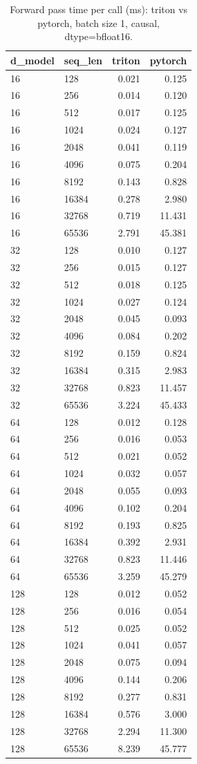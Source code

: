 \begin{table}
\centering
\begin{tabular}{llrr}
\toprule
d\_model & seq\_len & triton & pytorch \\
\midrule
16 & 128 & 0.021 & 0.125 \\
16 & 256 & 0.014 & 0.120 \\
16 & 512 & 0.017 & 0.125 \\
16 & 1024 & 0.024 & 0.127 \\
16 & 2048 & 0.041 & 0.119 \\
16 & 4096 & 0.075 & 0.204 \\
16 & 8192 & 0.143 & 0.828 \\
16 & 16384 & 0.278 & 2.980 \\
16 & 32768 & 0.719 & 11.431 \\
16 & 65536 & 2.791 & 45.381 \\
32 & 128 & 0.010 & 0.127 \\
32 & 256 & 0.015 & 0.127 \\
32 & 512 & 0.018 & 0.125 \\
32 & 1024 & 0.027 & 0.124 \\
32 & 2048 & 0.045 & 0.093 \\
32 & 4096 & 0.084 & 0.202 \\
32 & 8192 & 0.159 & 0.824 \\
32 & 16384 & 0.315 & 2.983 \\
32 & 32768 & 0.823 & 11.457 \\
32 & 65536 & 3.224 & 45.433 \\
64 & 128 & 0.012 & 0.128 \\
64 & 256 & 0.016 & 0.053 \\
64 & 512 & 0.021 & 0.052 \\
64 & 1024 & 0.032 & 0.057 \\
64 & 2048 & 0.055 & 0.093 \\
64 & 4096 & 0.102 & 0.204 \\
64 & 8192 & 0.193 & 0.825 \\
64 & 16384 & 0.392 & 2.931 \\
64 & 32768 & 0.823 & 11.446 \\
64 & 65536 & 3.259 & 45.279 \\
128 & 128 & 0.012 & 0.052 \\
128 & 256 & 0.016 & 0.054 \\
128 & 512 & 0.025 & 0.052 \\
128 & 1024 & 0.041 & 0.057 \\
128 & 2048 & 0.075 & 0.094 \\
128 & 4096 & 0.144 & 0.206 \\
128 & 8192 & 0.277 & 0.831 \\
128 & 16384 & 0.576 & 3.000 \\
128 & 32768 & 2.294 & 11.300 \\
128 & 65536 & 8.239 & 45.777 \\
\bottomrule
\end{tabular}
\caption{Forward pass time per call (ms): triton vs pytorch, batch size 1, causal, dtype=bfloat16.}
\label{tab:flash_forward_compare_bfloat16}
\end{table}

